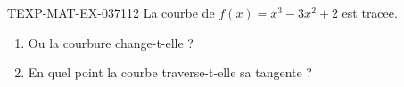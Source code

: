 \begin{exercice}{TEXP-MAT-EX-037}{1}{12}
La courbe de $f(x) = x^3 - 3x^2 + 2$ est tracee.
\begin{enumerate}
  \item Ou la courbure change-t-elle ?
  \item En quel point la courbe traverse-t-elle sa tangente ?
\end{enumerate}

\end{exercice}

